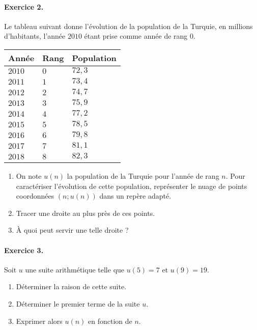 \documentclass[11pt]{article}
\begin{document}
\paragraph{Exercice 2.}
Le tableau suivant donne l'évolution de la population de la Turquie, en millions
d'habitants, l'année $2010$ étant prise comme année de rang $0$.
	\begin{center}
		\begin{tabular}{|>{\centering\arraybackslash}m{2cm}|
          >{\centering\arraybackslash}m{2cm}|
          >{\centering\arraybackslash}m{2cm}|}
			\hline
			\rule[-1ex]{0pt}{2.5ex} \textbf{Année} & \textbf{Rang} & \textbf{Population} \\
			\hline
			\rule[-1ex]{0pt}{2.5ex} $2010$ & $0$ & $72,3$ \\
			\hline
			\rule[-1ex]{0pt}{2.5ex} $2011$ & $1$ & $73,4$ \\
			\hline
			\rule[-1ex]{0pt}{2.5ex} $2012$ & $2$ & $74,7$ \\
			\hline
			\rule[-1ex]{0pt}{2.5ex} $2013$ & $3$ & $75,9$ \\
			\hline
			\rule[-1ex]{0pt}{2.5ex} $2014$ & $4$ & $77,2$ \\
			\hline
			\rule[-1ex]{0pt}{2.5ex} $2015$ & $5$ & $78,5$ \\
			\hline
			\rule[-1ex]{0pt}{2.5ex} $2016$ & $6$ & $79,8$ \\
			\hline
			\rule[-1ex]{0pt}{2.5ex} $2017$ & $7$ & $81,1$ \\
			\hline
			\rule[-1ex]{0pt}{2.5ex} $2018$ & $8$ & $82,3$ \\
			\hline
		\end{tabular}
	\end{center}
\begin{enumerate}
  \item On note $u(n)$ la population de la Turquie pour l’année de rang $n$.
    Pour caractériser l’évolution de cette population, représenter le nuage
    de points coordonnées $(n;u(n))$ dans un repère adapté.
  \item Tracer une droite au plus près de ces points.
  \item À quoi peut servir une telle droite ?
\end{enumerate}

\paragraph{Exercice 3.}
Soit $u$ une suite arithmétique telle que $u(5)=7$ et $u(9)=19$.
	\begin{enumerate}
		\item Déterminer la raison de cette suite.
		\item Déterminer le premier terme de la suite $u$.
		\item Exprimer alors $u(n)$ en fonction de $n$.
	\end{enumerate}
\end{document}
